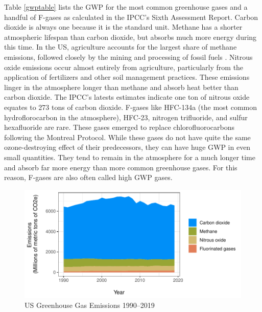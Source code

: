 Table \ref{gwptable} lists the GWP for the most common greenhouse gases and a handful of F-gases as calculated in the IPCC's Sixth Assessment Report. Carbon dioxide is always one because it is the standard unit. Methane has a shorter atmospheric lifespan than carbon dioxide, but absorbs much more energy during this time. In the US, agriculture accounts for the largest share of methane emissions, followed closely by the mining and processing of fossil fuels \citep{epa2020overview}. Nitrous oxide emissions occur almost entirely from agriculture, particularly from the application of fertilizers and other soil management practices. These emissions linger in the atmosphere longer than methane and absorb heat better than carbon dioxide. The IPCC's  latests estimates indicate one ton of nitrous oxide equates to 273 tons of carbon dioxide. F-gases like HFC-134a (the most common hydroflorocarbon in the atmosphere), HFC-23, nitrogen trifluoride, and sulfur hexafluoride are rare. These gases emerged to replace chlorofluorocarbons following the Montreal Protocol. While these gases do not have quite the same ozone-destroying effect of their predecessors, they can have huge GWP in even small quantities. They tend to remain in the atmosphere for a much longer time and absorb far more energy than more common greenhouse gases. For this reason, F-gases are also often called high GWP gases.

\begin{figure}
\caption{US Greenhouse Gas Emissions 1990--2019\label{ghg1}}
\centering
\includegraphics[width=\textwidth]{figures/chapter1_figures/ghg_stacked.pdf}
\end{figure}

